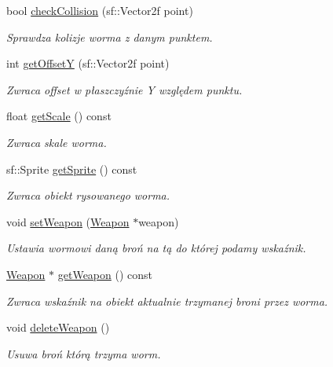 \begin{DoxyCompactItemize}
bool \mbox{\hyperlink{class_worm_a61589ff1104deb3cbf1cb6978e7f95f4}{check\+Collision}} (sf\+::\+Vector2f point)
\begin{DoxyCompactList}\small\item\em Sprawdza kolizje worma z danym punktem. \end{DoxyCompactList}\item 
int \mbox{\hyperlink{class_worm_a5a9fb6f1859a7b5cf6c447ea3ae0c1e5}{get\+OffsetY}} (sf\+::\+Vector2f point)
\begin{DoxyCompactList}\small\item\em Zwraca offset w płaszczyźnie Y względem punktu. \end{DoxyCompactList}\item 
float \mbox{\hyperlink{class_worm_a72cf5070503bcba6423773de3367cdfd}{get\+Scale}} () const
\begin{DoxyCompactList}\small\item\em Zwraca skale worma. \end{DoxyCompactList}\item 
sf\+::\+Sprite \mbox{\hyperlink{class_worm_a9b314b9a4bb91830aac7f616ef071c07}{get\+Sprite}} () const
\begin{DoxyCompactList}\small\item\em Zwraca obiekt rysowanego worma. \end{DoxyCompactList}\item 
void \mbox{\hyperlink{class_worm_a9f2a337a176e5186c7227880337c98c3}{set\+Weapon}} (\mbox{\hyperlink{class_weapon}{Weapon}} $\ast$weapon)
\begin{DoxyCompactList}\small\item\em Ustawia wormowi daną broń na tą do której podamy wskaźnik. \end{DoxyCompactList}\item 
\mbox{\hyperlink{class_weapon}{Weapon}} $\ast$ \mbox{\hyperlink{class_worm_a42f56e4d14502d65c500fb20bd31a561}{get\+Weapon}} () const
\begin{DoxyCompactList}\small\item\em Zwraca wskaźnik na obiekt aktualnie trzymanej broni przez worma. \end{DoxyCompactList}\item 
void \mbox{\hyperlink{class_worm_adbede9b2b03f764f71629a299aec5299}{delete\+Weapon}} ()
\begin{DoxyCompactList}\small\item\em Usuwa broń którą trzyma worm. \end{DoxyCompactList}\item 

\end{DoxyCompactItemize}
